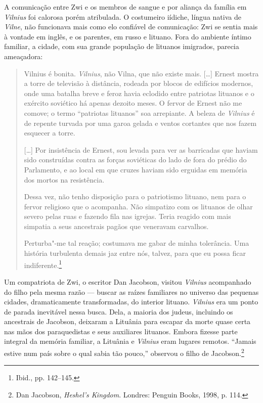 A comunicação entre Zwi e os membros de sangue e por aliança da família
em \textit{Vilnius} foi calorosa porém atribulada. O costumeiro iídiche, língua
nativa de \textit{Vilne}, não funcionava mais como elo confiável de comunicação:
Zwi se sentia mais à vontade em inglês, e os parentes, em russo e
lituano. Fora do ambiente íntimo familiar, a cidade, com sua grande
população de lituanos imigrados, parecia ameaçadora:

\begin{quote}
Vilnius é bonita. \textit{Vilnius}, não Vilna, que não existe mais.
[\ldots{}] Ernest mostra a torre de televisão à distância, rodeada por
blocos de edifícios modernos, onde uma batalha breve e feroz havia
eclodido entre patriotas lituanos e o exército soviético há apenas
dezoito meses. O fervor de Ernest não me comove; o termo ``patriotas
lituanos'' soa arrepiante. A beleza de \textit{Vilnius} é de repente turvada por
uma garoa gelada e ventos cortantes que nos fazem esquecer a torre.

[\ldots{}] Por insistência de Ernest, sou levada para ver as barricadas
que haviam sido construídas contra as forças soviéticas do lado de fora
do prédio do Parlamento, e ao local em que cruzes haviam sido erguidas
em memória dos mortos na resistência.

Dessa vez, não tenho disposição para o patriotismo lituano, nem para o
fervor religioso que o acompanha. Não simpatizo com os lituanos de olhar
severo pelas ruas e fazendo fila nas igrejas. Teria reagido com mais
simpatia a seus ancestrais pagãos que veneravam carvalhos.

Perturba"-me tal reação; costumava me gabar de minha tolerância. Uma
história turbulenta demais jaz entre nós, talvez, para que eu possa
ficar indiferente.\footnote{Ibid., pp. 142--145.}
\end{quote}

Um compatriota de Zwi, o escritor Dan Jacobson, visitou \textit{Vilnius}
acompanhado do filho pela mesma razão --- buscar as raízes familiares no
universo das pequenas cidades, dramaticamente transformadas, do interior
lituano. \textit{Vilnius} era um ponto de parada inevitável nessa busca. Dela, a
maioria dos judeus, incluindo os ancestrais de Jacobson, deixaram a
Lituânia para escapar da morte quase certa nas mãos dos paraquedistas
 e seus auxiliares lituanos. Embora fizesse parte integral da memória
familiar, a Lituânia e \textit{Vilnius} eram lugares remotos. ``Jamais estive num
país sobre o qual sabia tão pouco,'' observou o filho de
Jacobson.\footnote{Dan Jacobson, \textit{Heshel's Kingdom}. Londres: Penguin Books, 1998, p. 114.}

